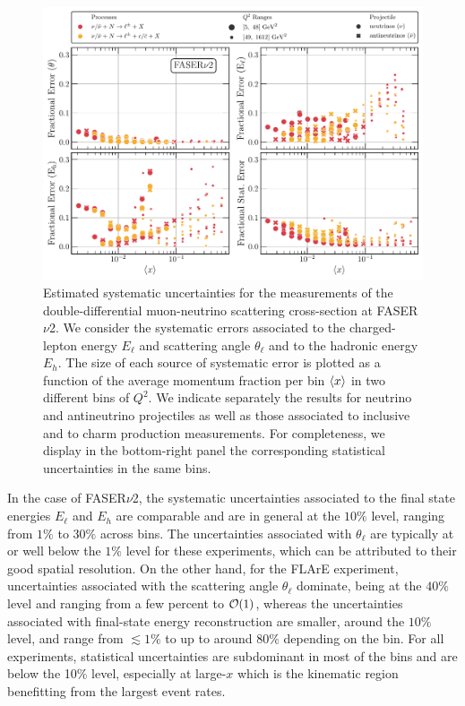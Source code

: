 \begin{figure}[t]
  \centering
  \includegraphics[width=\textwidth]{plots/FASERv2_fractional_error.pdf}
  \caption{\small Estimated systematic uncertainties for the  measurements
    of the double-differential
    muon-neutrino scattering cross-section at FASER$\nu$2.
    We consider the systematic errors
    associated to the charged-lepton energy $E_\ell$ and scattering angle $\theta_\ell$
    and to the hadronic energy $E_h$.
    The size of each source of systematic error is plotted as a function
    of the average momentum fraction per bin $\left\langle x\right\rangle$
    in two different bins of $Q^2$.
    We indicate separately the results for neutrino and antineutrino projectiles as well as
    those associated to inclusive and to charm production measurements.
    For completeness, we display in the bottom-right panel the corresponding
    statistical uncertainties in the same bins.
  }
  \label{fig:percentage_uncertainties_overview}
\end{figure}

In the case of FASER$\nu$2, the systematic uncertainties associated to the final state energies $E_\ell$ and $E_h$ are comparable and are in general at the $10\%$ level, ranging
from $1\%$ to  $30\%$ across bins.
%
The uncertainties associated with $\theta_\ell$ are typically at or well below the $1\%$ level
for these experiments, which can be attributed to their good spatial
resolution. 
%
On the other hand, for the FLArE experiment, uncertainties associated with the scattering angle $\theta_\ell$ dominate, being at the $ 40\%$ level and ranging from a few percent to ${\cal O}(1)$,
whereas the uncertainties associated with final-state energy reconstruction
are smaller, around the $10\%$ level, and range from $\lesssim 1\%$ to up to around $80\%$
depending on the bin.
%
For all experiments, statistical uncertainties are subdominant in most of the bins and are below the 10\% level,
especially at large-$x$ which is the kinematic region benefitting from the largest event rates.

